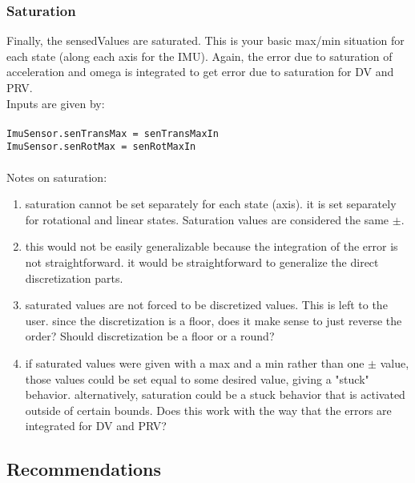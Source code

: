 \documentclass[]{BasiliskReportMemo}
\begin{document}
\subsubsection{Saturation}
Finally, the sensedValues are saturated. This is your basic max/min situation for each state (along each axis for the IMU). Again, the error due to saturation of acceleration and omega is integrated to get error due to saturation for DV and PRV.\\
Inputs are given by:\\\\
\verb|ImuSensor.senTransMax = senTransMaxIn|\\
\verb|ImuSensor.senRotMax = senRotMaxIn|\\\\
Notes on saturation:
\begin{enumerate}
	\item  saturation cannot be set separately for each state (axis). it is set separately for rotational and linear states. Saturation values are considered the same $\pm$.
	\item this would not be easily generalizable because the integration of the error is not straightforward. it would be straightforward to generalize the direct discretization parts.
	\item saturated values are not forced to be discretized values. This is left to the user. since the discretization is a floor, does it make sense to just reverse the order? Should discretization be a floor or a round?
	\item if saturated values were given with a max and a min rather than one $\pm$ value, those values could be set equal to some desired value, giving a "stuck" behavior. alternatively, saturation could be a stuck behavior that is activated outside of certain bounds. Does this work with the way that the errors are integrated for DV and PRV?
\end{enumerate}

\subsection{Recommendations}
\end{document}
